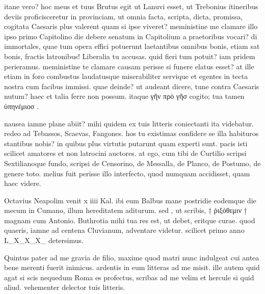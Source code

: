 


 itane vero? hoc meus et tuus Brutus egit ut Lanuvi esset, ut Trebonius itineribus deviis proficisceretur in provinciam, ut omnia facta, scripta, dicta, promissa, cogitata Caesaris plus valerent quam si ipse viveret? meministine me clamare illo ipso primo Capitolino die debere senatum in Capitolium a praetoribus vocari? di immortales, quae tum opera effici potuerunt laetantibus omnibus bonis, etiam sat bonis, fractis latronibus! Liberalia tu accusas. quid fieri tum potuit? iam pridem perieramus. meministine te clamare causam perisse si funere elatus esset? at ille etiam in foro combustus laudatusque miserabiliter servique et egentes in tecta nostra cum facibus immissi. quae deinde? ut audeant dicere, tune contra Caesaris nutum? haec et talia ferre non possum. itaque γῆν πρὸ γῆσ cogito; tua tamen ὑπηνέμιοσ .

 nausea iamne plane abiit? mihi quidem ex tuis litteris coniectanti ita videbatur. redeo ad Tebassos, Scaevas, Fangones. hos tu existimas confidere se illa habituros stantibus nobis? in quibus plus virtutis putarunt quam experti sunt. pacis isti scilicet amatores et non latrocini auctores. at ego, cum tibi de Curtilio scripsi Sextilianoque fundo, scripsi de Censorino, de Messalla, de Planco, de Postumo, de genere toto. melius fuit perisse illo interfecto, quod numquam accidisset, quam haec videre.

 Octavius Neapolim venit x iiii Kal. ibi eum Balbus mane postridie eodemque die mecum in Cumano, illum hereditatem aditurum. sed , ut scribis, † ῤιξόθεμιν † magnam cum Antonio. Buthrotia mihi tua res est, ut debet, eritque curae. quod quaeris, iamne ad centena Cluvianum, adventare videtur. scilicet primo anno L_X_X_X_ detersimus.

 Quintus pater ad me gravia de filio, maxime quod matri nunc indulgeat cui antea bene merenti fuerit inimicus. ardentis in eum litteras ad me misit. ille autem quid agat si scis nequedum Roma es profectus, scribas ad me velim et hercule si quid aliud. vehementer delector tuis litteris.
